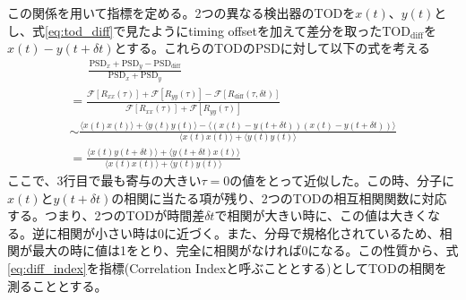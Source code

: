 この関係を用いて指標を定める。2つの異なる検出器のTODを$x(t)$、$y(t)$とし、式\eqref{eq:tod_diff}で見たようにtiming offsetを加えて差分を取った$\mathrm{TOD}_{\mathrm{diff}}$を$x(t)-y(t+\delta t)$とする。これらのTODのPSDに対して以下の式を考える
\begin{align}
  & \phantom{=}\, \frac{\mathrm{PSD}_{x} + \mathrm{PSD}_{y} - \mathrm{PSD}_{\mathrm{diff}}}{\mathrm{PSD}_{x} + \mathrm{PSD}_{y}} \label{eq:diff_index} & \\ \label{eq:diff_index2}
  & = \frac{\mathcal{F}[R_{xx}(\tau)] + \mathcal{F}[R_{yy}(\tau)] - \mathcal{F}[R_{\mathrm{diff}}(\tau,\delta t)] }{\mathcal{F}[R_{xx}(\tau)] + \mathcal{F}[R_{yy}(\tau)] }& \\
  & \sim \frac{\langle x(t)x(t)\rangle + \langle y(t)y(t)\rangle - \langle (x(t) - y(t+\delta t))(x(t) - y(t+\delta t))\rangle}{\langle x(t)x(t)\rangle + \langle y(t)y(t)\rangle}& \\
  & = \frac{\langle x(t)y(t+\delta t)\rangle + \langle y(t+\delta t)x(t)\rangle }{\langle x(t)x(t)\rangle + \langle y(t)y(t)\rangle}
\end{align}
ここで、3行目で最も寄与の大きい$\tau=0$の値をとって近似した。この時、分子に$x(t)$と$y(t+\delta t)$の相関に当たる項が残り、2つのTODの相互相関関数に対応する。つまり、2つのTODが時間差$\delta t$で相関が大きい時に、この値は大きくなる。逆に相関が小さい時は0に近づく。また、分母で規格化されているため、相関が最大の時に値は1をとり、完全に相関がなければ0になる。この性質から、式\eqref{eq:diff_index}を指標(Correlation Indexと呼ぶこととする)としてTODの相関を測ることとする。

